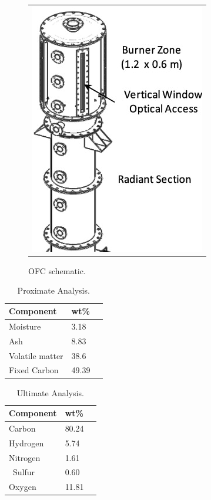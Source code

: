 \documentclass[review,3p]{elsarticle}
\begin{document}
\begin{figure}
\begin{center}
\begin{tabular}{c}
\includegraphics[width=2 in]{../figures/OFC_pic.jpg}
\end{tabular}
\caption{OFC schematic.}
\label{f:OFC}
\end{center}
\end{figure}




\begin{table}[h]
	\caption{Proximate Analysis.}
	\label{t:prox}
	\centering
	\begin{tabular}{l l l}
	\hline
	Component & wt\% \\ \hline
    Moisture & 3.18 \\ 
    Ash & 8.83 \\ 
    Volatile matter & 38.6  \\ 
    Fixed Carbon & 49.39  \\ 
\hline
\end{tabular}
\end{table}


\begin{table}[!h]
	\caption{Ultimate Analysis.}
	\label{t:ult}
	\centering
	\begin{tabular}{l l l}
	\hline
	Component & wt\% \\ \hline
	Carbon & 80.24 \\ 
    Hydrogen & 5.74 \\ 
    Nitrogen & 1.61 \\ \
    Sulfur & 0.60 \\ 
    Oxygen & 11.81 \\ 
\hline
\end{tabular}
\end{table}
\end{document}
